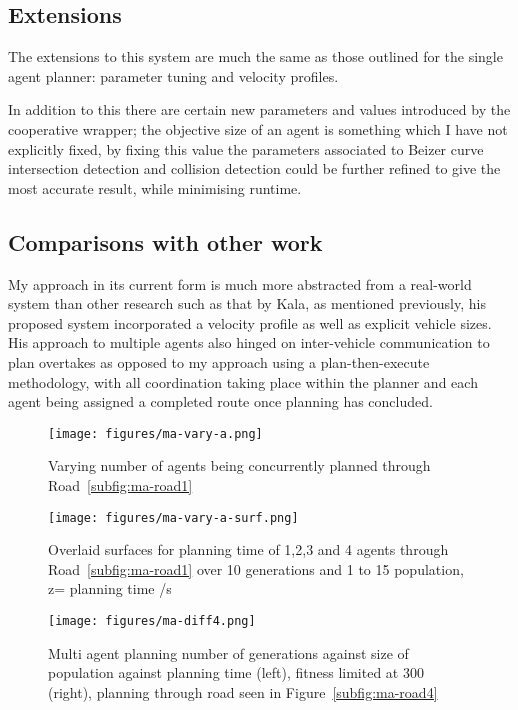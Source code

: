 \subsection{Extensions}

The extensions to this system are much the same as those outlined for the single agent planner: parameter tuning and velocity profiles.

In addition to this there are certain new parameters and values introduced by the cooperative wrapper; the objective size of an agent is something which I have not explicitly fixed, by fixing this value the parameters associated to Beizer curve intersection detection and collision detection could be further refined to give the most accurate result, while minimising runtime.

\subsection{Comparisons with other work}

My approach in its current form is much more abstracted from a real-world system than other research such as that by Kala, as mentioned previously, his proposed system incorporated a velocity profile as well as explicit vehicle sizes. His approach to multiple agents also hinged on inter-vehicle communication to plan overtakes as opposed to my approach using a plan-then-execute methodology, with all coordination taking place within the planner and each agent being assigned a completed route once planning has concluded.

\begin{figure}[ht]
  \centering
  \texttt{[image: figures/ma-vary-a.png]}
  \caption{\label{fig:ma-vary-a} Varying number of agents being concurrently planned through Road~\ref{subfig:ma-road1}}
\end{figure}

\begin{figure}[ht]
  \centering
  \texttt{[image: figures/ma-vary-a-surf.png]}
  \caption{\label{fig:ma-vary-a-surf} Overlaid surfaces for planning time of 1,2,3 and 4 agents through Road~\ref{subfig:ma-road1} over 10 generations and 1 to 15 population, z= planning time /s}
\end{figure}

\begin{figure}[ht]
  \centering
  \texttt{[image: figures/ma-diff4.png]}
  \caption{\label{fig:ma-diff4} Multi agent planning number of generations against size of population against planning time (left), fitness limited at 300 (right), planning through road seen in Figure~\ref{subfig:ma-road4}}
\end{figure}

